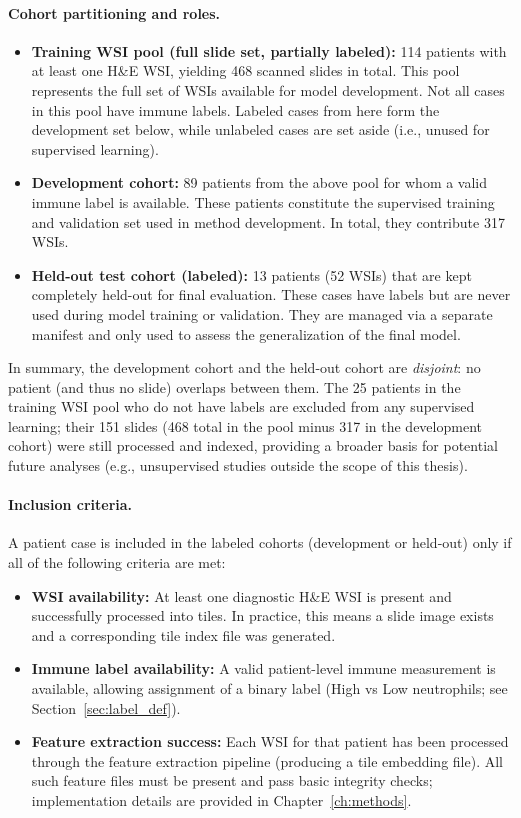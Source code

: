 \paragraph{Cohort partitioning and roles.}
\begin{itemize}
    \item \textbf{Training WSI pool (full slide set, partially labeled):} 114 patients with at least one H\&E WSI, yielding 468 scanned slides in total. This pool represents the full set of WSIs available for model development. Not all cases in this pool have immune labels. Labeled cases from here form the development set below, while unlabeled cases are set aside (i.e., unused for supervised learning).
    \item \textbf{Development cohort:} 89 patients from the above pool for whom a valid immune label is available. These patients constitute the supervised training and validation set used in method development. In total, they contribute 317 WSIs.
    \item \textbf{Held-out test cohort (labeled):} 13 patients (52 WSIs) that are kept completely held-out for final evaluation. These cases have labels but are never used during model training or validation. They are managed via a separate manifest and only used to assess the generalization of the final model. 
\end{itemize}

In summary, the development cohort and the held-out cohort are \emph{disjoint}: no patient (and thus no slide) overlaps between them. The 25 patients in the training WSI pool who do not have labels are excluded from any supervised learning; their 151 slides (468 total in the pool minus 317 in the development cohort) were still processed and indexed, providing a broader basis for potential future analyses (e.g., unsupervised studies outside the scope of this thesis).

\paragraph{Inclusion criteria.}
A patient case is included in the labeled cohorts (development or held-out) only if all of the following criteria are met:
\begin{itemize}
    \item \textbf{WSI availability:} At least one diagnostic H\&E WSI is present and successfully processed into tiles. In practice, this means a slide image exists and a corresponding tile index file was generated.
    \item \textbf{Immune label availability:} A valid patient-level immune measurement is available, allowing assignment of a binary label (High vs Low neutrophils; see Section~\ref{sec:label_def}).
    \item \textbf{Feature extraction success:} Each WSI for that patient has been processed through the feature extraction pipeline (producing a tile embedding file). All such feature files must be present and pass basic integrity checks; implementation details are provided in Chapter~\ref{ch:methods}.
\end{itemize}

